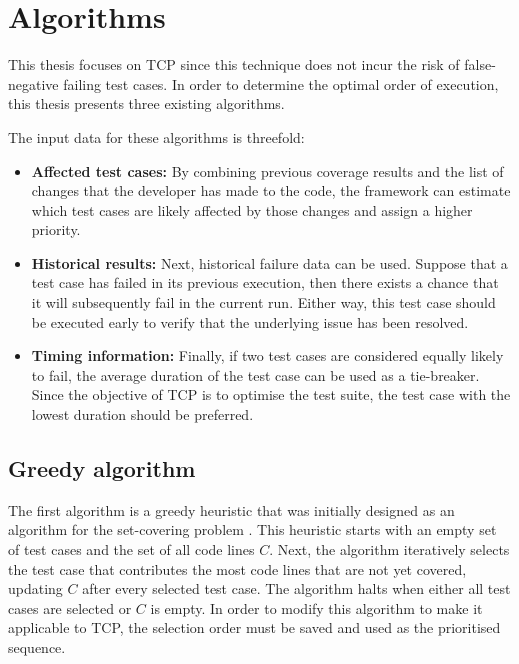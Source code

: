 \section{Algorithms}
\noindent This thesis focuses on TCP since this technique does not incur the risk of false-negative failing test cases. In order to determine the optimal order of execution, this thesis presents three existing algorithms.\\

\mbox{}

\noindent The input data for these algorithms is threefold:\\

\begin{itemize}[leftmargin=1em]
\item \textbf{Affected test cases:} By combining previous coverage results and the list of changes that the developer has made to the code, the framework can estimate which test cases are likely affected by those changes and assign a higher priority.

\item \textbf{Historical results:} Next, historical failure data can be used. Suppose that a test case has failed in its previous execution, then there exists a chance that it will subsequently fail in the current run. Either way, this test case should be executed early to verify that the underlying issue has been resolved.

\item \textbf{Timing information:} Finally, if two test cases are considered equally likely to fail, the average duration of the test case can be used as a tie-breaker. Since the objective of TCP is to optimise the test suite, the test case with the lowest duration should be preferred.
\end{itemize}

\subsection{Greedy algorithm}
\noindent The first algorithm is a greedy heuristic that was initially designed as an algorithm for the set-covering problem \cite{evaluationoftestsuiteminimization}. This heuristic starts with an empty set of test cases and the set of all code lines $C$. Next, the algorithm iteratively selects the test case that contributes the most code lines that are not yet covered, updating $C$ after every selected test case. The algorithm halts when either all test cases are selected or $C$ is empty. In order to modify this algorithm to make it applicable to TCP, the selection order must be saved and used as the prioritised sequence.

